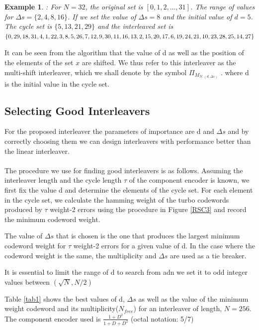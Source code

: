 \documentclass[twocolumn]{article}
\newtheorem{example}[theorem]{Example}
\begin{document}
  \begin{example}
  \label{E2}
 : For $N=32$, the original set is $[0,1,2,...,31]$. The range of values for 
 $\Delta s = \{ 2,4,8,16\}$.  If we set the value
 of $\Delta s = 8$ and the initial value of $d=5$. 
 The cycle set is $\{ 5,13,21,29\}$ and the interleaved set is 
  $\{0, 29, 18, 31, 4, 1, 22, 3, 8, 5, 26, 7, 12, 9, 30, 11, 16, 13, 2,\\
  15, 20, 17, 6, 19, 24, 21, 10, 23, 28,25, 14, 27\}$
 
 \end{example}
 It can be seen from the algorithm that the value of d as well as the position of the 
 elements of the set $x$ are shifted. We thus refer to this interleaver as the multi-shift 
 interleaver, which we shall denote by the symbol $\Pi_{\mathit{M}_{N:(d,\Delta s)}}$ .
 where d is the initial value in the cycle set.

 \subsection{Selecting Good Interleavers}
 For the proposed interleaver the parameters of importance are d and $\Delta s$ and
 by correctly choosing them we can design interleavers with performance better
 than the linear interleaver. 
  \paragraph{}
 The procedure we use for finding good interleavers is as follows. Assuming
 the interleaver length and the cycle length $\tau$ of the component 
 encoder is known, we first fix the value d and determine the elements of the cycle set.
 For each element in the cycle set, we calculate the hamming weight of the 
 turbo codewords 
 produced by $\tau$ weight-2 errors
 using the procedure in Figure \ref{RSC3} and record the minimum codeword weight. 

 
 The value of 
 $\Delta s$ that is chosen is the one that produces the largest minimum codeword 
 weight for $\tau$ weight-2 errors
 for a given value of d. In the case where the codeword weight is the same, the 
 multiplicity and $\Delta s$ are used as a tie breaker.
 
 It is essential to limit the range of d to search from adn we set it to
 odd integer values between $(\sqrt{N},N/2)$
 
 
 Table \ref{tab1} shows the best values of d, $\Delta s$
 as well as the value of the minimum weight codeword and its multiplicity($N_{free}$)
  for an interleaver 
 of length, $N=256$. The component encoder used is $\frac{1 + D^2}{1+D+D^2}$ 
 (octal notation: 5/7) 
 
\end{document}
